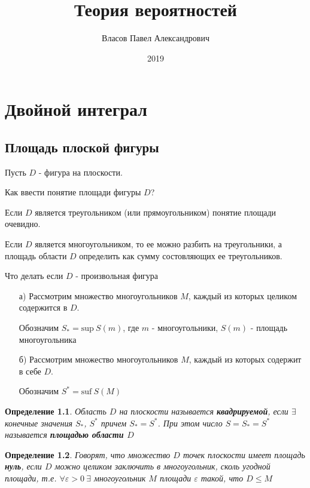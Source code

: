 \documentclass[a4paper, 14pt]{report}
\author{Власов Павел Александрович}
\title{Теория вероятностей}
\date{2019}
\newtheorem{defenition}{Определение}[chapter]
\begin{document}
\maketitle

\tableofcontents
\clearpage

\chapter{Двойной интеграл}

\section{Площадь плоской фигуры}

Пусть $D$ - фигура на плоскости.

Как ввести понятие площади фигуры $D$?

Если $D$ является треугольником (или прямоугольником) понятие площади очевидно.

Если $D$ является многоугольником, то ее можно разбить на треугольники, а площадь области $D$ определить как сумму состовляющих ее треугольников.

Что делать если $D$ - произвольная фигура

\begin{enumerate}

    \item[а)] Рассмотрим множество многоугольников $M$, каждый из которых целиком содержится в $D$.

    Обозначим $S_* = \text{sup}\ S(m)$, где $m$ - многоугольники, $S(m)$ - площадь многоугольника

    \item[б)] Рассмотрим множество многоугольников $M$, каждый из которых содержит в себе $D$.

    Обозначим $S^* = \text{suf}\ S(M)$

\end{enumerate}

\begin{defenition}
    Область $D$ на плоскости называется \textbf{квадрируемой}, если $\exists$ конечные значения $S_*$, $S^*$ причем $S_* = S^*$. При этом число $S = S_* = S^*$ называется \textbf{площадью области $D$}
\end{defenition}

\hfill

\begin{defenition}
    Говорят, что множество $D$ точек плоскости имеет площадь \textbf{нуль}, если $D$ можно целиком заключить в многоугольник, сколь угодной площади, т.е. $\forall \varepsilon > 0\ \exists$ многоугольник $M$ площади $\varepsilon$ такой, что $D \le M$
\end{defenition}
\end{document}
